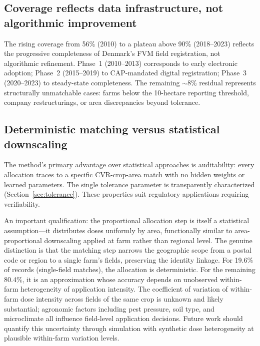 \documentclass[12pt,a4paper]{article}
\begin{document}
\subsection{Coverage reflects data infrastructure, not algorithmic improvement}

The rising coverage from 56\% (2010) to a plateau above 90\% (2018--2023) reflects the progressive completeness of Denmark's FVM field registration, not algorithmic refinement. Phase~1 (2010--2013) corresponds to early electronic adoption; Phase~2 (2015--2019) to CAP-mandated digital registration; Phase~3 (2020--2023) to steady-state completeness. The remaining $\sim$8\% residual represents structurally unmatchable cases: farms below the 10-hectare reporting threshold, company restructurings, or area discrepancies beyond tolerance.

\subsection{Deterministic matching versus statistical downscaling}

The method's primary advantage over statistical approaches \cite{balcaen2025,deguine2023,maggi2019} is auditability: every allocation traces to a specific CVR-crop-area match with no hidden weights or learned parameters. The single tolerance parameter is transparently characterized (Section~\ref{sec:tolerance}). These properties suit regulatory applications requiring verifiability.

An important qualification: the proportional allocation step is itself a statistical assumption---it distributes doses uniformly by area, functionally similar to area-proportional downscaling applied at farm rather than regional level. The genuine distinction is that the matching step narrows the geographic scope from a postal code or region to a single farm's fields, preserving the identity linkage. For 19.6\% of records (single-field matches), the allocation is deterministic. For the remaining 80.4\%, it is an approximation whose accuracy depends on unobserved within-farm heterogeneity of application intensity. The coefficient of variation of within-farm dose intensity across fields of the same crop is unknown and likely substantial; agronomic factors including pest pressure, soil type, and microclimate all influence field-level application decisions. Future work should quantify this uncertainty through simulation with synthetic dose heterogeneity at plausible within-farm variation levels.
\end{document}
